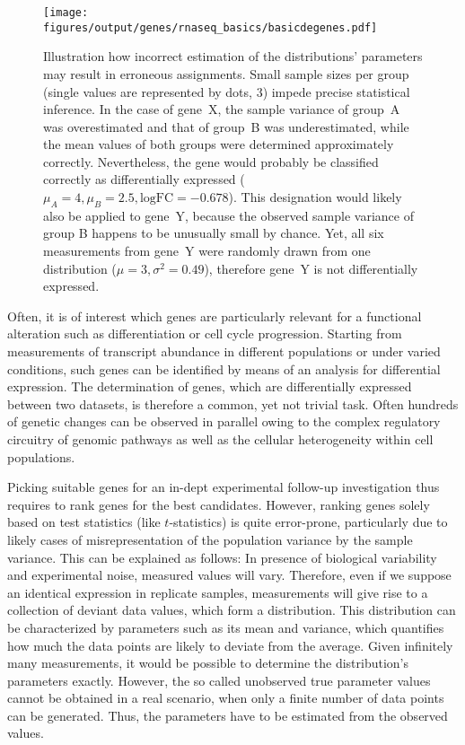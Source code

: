 \begin{figure}[!ht]
	\centering
	\texttt{[image: figures/output/genes/rnaseq\_basics/basicdegenes.pdf]} 
	\caption{Illustration how incorrect estimation of the distributions' parameters may result in erroneous assignments. Small sample sizes per group (single values are represented by dots, \ensuremath{\!3}) impede precise statistical inference. In the case of gene~X, the sample variance of group~A was overestimated and that of group~B was underestimated, while the mean values of both groups were determined approximately correctly. Nevertheless, the gene would probably be classified correctly as differentially expressed (\ensuremath{\mu_A = 4, \mu_B = 2.5, \text{logFC}= -0.678}). This designation would likely also be applied to gene~Y, because the observed sample variance of group B happens to be unusually small by chance. Yet, all six measurements from gene~Y were randomly drawn from one distribution (\ensuremath{\mu = 3, \sigma^2 = 0.49}), therefore gene~Y is not differentially expressed. }
	\label{fig:genes:basicdegenes.pdf}
\end{figure}

Often, it is of interest which genes are particularly relevant for a functional alteration such as differentiation or cell cycle progression. Starting from measurements of transcript abundance in different populations or under varied conditions, such genes can be identified by means of an analysis for differential expression. The determination of genes, which are differentially expressed between two datasets, is therefore a common, yet not trivial task. Often hundreds of genetic changes can be observed in parallel owing to the complex regulatory circuitry of genomic pathways as well as the cellular heterogeneity within cell populations.

Picking suitable genes for an in-dept experimental follow-up investigation thus requires to rank genes for the best candidates. However, ranking genes solely based on test statistics (like $t$-statistics) is quite error-prone, particularly due to likely cases of misrepresentation of the population variance by the sample variance. This can be explained as follows: In presence of biological variability and experimental noise, measured values will vary. Therefore, even if we suppose an identical expression in replicate samples, measurements will give rise to a collection of deviant data values, which form a distribution. This distribution can be characterized by parameters such as its mean and variance, which quantifies how much the data points are likely to deviate from the average. Given infinitely many measurements, it would be possible to determine the distribution's parameters exactly. However, the so called unobserved true parameter values cannot be obtained in a real scenario, when only a finite number of data points can be generated. Thus, the parameters have to be estimated from the observed values.

